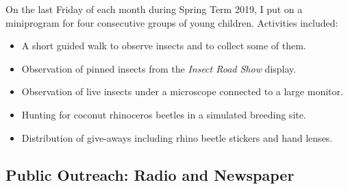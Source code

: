 On the last Friday of each month during Spring Term 2019, I put on a miniprogram for four consecutive groups of young children. Activities included:
\begin{itemize}
	\item A short guided walk to observe insects and to collect some of them.
	\item Observation of pinned insects from the \textit{Insect Road Show} display.
	\item Observation of live insects under a microscope connected to a large monitor.
	\item Hunting for coconut rhinoceros beetles in a simulated breeding site.
	\item Distribution of give-aways including rhino beetle stickers and hand lenses.
\end{itemize}
	

\subsection{Public Outreach: Radio and Newspaper}

\begin{refsection}
	\nocite{*}
	\printbibliography[filter=press, heading=none]
\end{refsection} 

\begin{comment}

\raggedright\vspace{2mm}\textbf{Activity}
\begin{itemize}
\item Presentations \cite{moore2018building2,blas2018protecting,deloso2018parasitoid,moore2018freecell,moore2018coconut,moore2018biological2,moore2018freecell2,marshall2018progress,moore2018attempted,moore2017impactof,moore2018biological,moore2018building,moore2017invasion,moore2017coconut,moore2017usingfree,moore2017accessto,moore2017biological,moore2017thecoconut,moore2017biological2,moore2017biological3}
\item Workshops \cite{berringer2018sixteenth,moore2017bringyour,moore2018cnasworkshop,quitugua20182018coconut}
\item Press \cite{moore2018special,varietyuogseeks,pacific2018scientists,2018viralcontrol,postnewtree,leonguerrero2018interview,2018g2ghuman,2017tracking}
\end{itemize}
\raggedright\vspace{2mm}\textbf{Reference(s)}

\begin{btSect}[vancouver]{zotero}
\btPrintCited
\end{btSect}
\newpage{}
\end{btUnit}

\begin{btUnit}

\end{comment}

